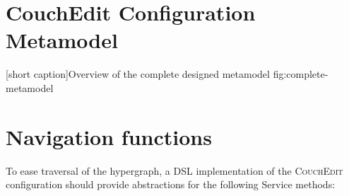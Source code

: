 \chapter{CouchEdit Configuration Metamodel}
%   

%
   {}%
   [short caption]{Overview of the complete designed metamodel}%
   {fig:complete-metamodel}
   
\chapter{Navigation functions}
\label{app:navigationfunctions}

To ease traversal of the hypergraph, a DSL implementation of the \textsc{CouchEdit} configuration should provide abstractions for the following Service methods:

